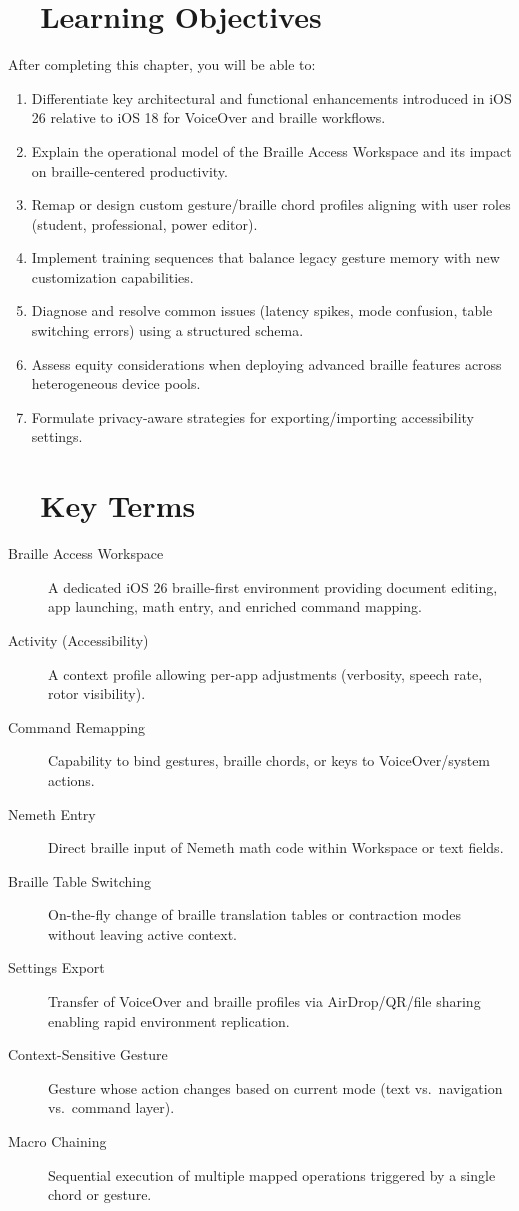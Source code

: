 \section{~~Learning Objectives}
\label{sec:sr30-learning-objectives}
After completing this chapter, you will be able to:
\begin{enumerate}
	\item Differentiate key architectural and functional enhancements introduced in iOS 26 relative to iOS 18 for VoiceOver and braille workflows.
	\item Explain the operational model of the Braille Access Workspace and its impact on braille-centered productivity.
	\item Remap or design custom gesture/braille chord profiles aligning with user roles (student, professional, power editor).
	\item Implement training sequences that balance legacy gesture memory with new customization capabilities.
	\item Diagnose and resolve common issues (latency spikes, mode confusion, table switching errors) using a structured schema.
	\item Assess equity considerations when deploying advanced braille features across heterogeneous device pools.
	\item Formulate privacy-aware strategies for exporting/importing accessibility settings.
\end{enumerate}

\section{~~Key Terms}
\label{sec:sr30-key-terms}
\begin{description}
	\item[Braille Access Workspace] A dedicated iOS 26 braille-first environment providing document editing, app launching, math entry, and enriched command mapping\supercite{myvision2025}.
	\item[Activity (Accessibility)] A context profile allowing per-app adjustments (verbosity, speech rate, rotor visibility)\supercite{applevisVO2024}.
	\item[Command Remapping] Capability to bind gestures, braille chords, or  keys to VoiceOver/system actions\supercite{hks2025}.
	\item[Nemeth Entry] Direct braille input of Nemeth math code within Workspace or text fields\supercite{appleSupportBSI2025}.
	\item[Braille Table Switching] On-the-fly change of braille translation tables or contraction modes without leaving active context.
	\item[Settings Export] Transfer of VoiceOver and braille profiles via AirDrop/QR/file sharing enabling rapid environment replication\supercite{myvision2025}.
	\item[Context-Sensitive Gesture] Gesture whose action changes based on current mode (text vs.\ navigation vs.\ command layer).
	\item[Macro Chaining] Sequential execution of multiple mapped operations triggered by a single chord or gesture.
\end{description}

